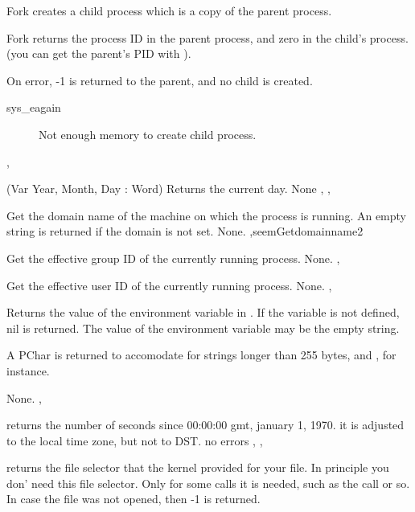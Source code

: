 {
Fork creates a child process which is a copy of the parent process.

Fork returns the process ID in the parent process, and zero in the child's
process. (you can get the parent's PID with ).
}
{On error, -1 is returned to the parent, and no child is created.
\begin{description}
\item [sys\_eagain] Not enough memory to create child process.
\end{description}
}
{, }



{ (Var Year, Month, Day : Word) }
{
Returns the current day.
}
{None}
{, ,  }



{
Get the domain name of the machine on which the process is running.
An empty string is returned if the domain is not set.
}
{None.}
{ ,seem{Getdomainname}{2} }



{ Get the effective group ID of the currently running process.}
{None.}
{,  }



{ Get the effective user ID of the currently running process.}
{None.}
{,  }



{Returns the value of the environment variable in . If the variable is
not defined, nil is returned. The value of the environment variable may be
the empty string.

A PChar is returned to accomodate for strings longer than 255 bytes,
 and , for instance.
}
{None.}
{,  }



{
returns the number of seconds since 00:00:00 gmt, january 1, 1970.
it is adjusted to the local time zone, but not to DST.
}
{no errors}
{, , }


{ returns the file selector that the kernel provided for your
file. In principle you don' need this file selector. Only for some calls
it is needed, such as the  call or so.}
{In case the file was not opened, then -1 is returned.}
{}

